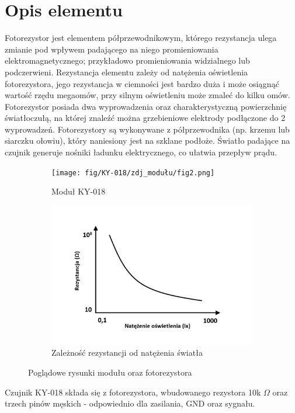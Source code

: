 \documentclass[11pt, a4paper]{article}
\author{Dawid Wasung}
\institute{Instytut Robotyki i Inteligencji Maszynowej}
\begin{document}
\newpage

\section*{Opis elementu} 
Fotorezystor jest elementem półprzewodnikowym, którego rezystancja ulega zmianie pod wpływem padającego na niego promieniowania elektromagnetycznego; przykładowo promieniowania widzialnego lub podczerwieni. Rezystancja elementu zależy od natężenia oświetlenia fotorezystora, jego rezystancja w ciemności jest bardzo duża i może osiągnąć wartość rzędu megaomów, przy silnym oświetleniu może zmaleć do kilku omów. Fotorezystor posiada dwa wyprowadzenia oraz charakterystyczną powierzchnię światłoczułą, na której znaleźć można grzebieniowe elektrody podłączone do 2 wyprowadzeń. Fotorezystory są wykonywane z półprzewodnika (np. krzemu lub siarczku ołowiu), który naniesiony jest na szklane podłoże. Światło padające na czujnik generuje nośniki ładunku elektrycznego, co ułatwia przepływ prądu. 
\vspace{0.5cm}
\begin{figure}[h!]
\centering
\begin{subfigure}{.5\textwidth}
  \centering
  \texttt{[image: fig/KY-018/zdj\_modułu/fig2.png]}
  \caption{Moduł KY-018 \cite{ArduinoModules:grab}}
  \label{fig:sub1}
\end{subfigure}%
\begin{subfigure}{.5\textwidth}
  \centering
  \includegraphics[width=1.05\linewidth]{fig/KY-018/zasada_dzialania/Charakterystyka.png}
  \caption{Zależność rezystancji od natężenia światła \cite{Foto:Wiki}}
  \label{fig:sub2}
\end{subfigure}
\caption{Poglądowe rysunki modułu oraz fotorezystora}
\label{fig:test}
\end{figure}
\newline
Czujnik KY-018 składa się z fotorezystora, wbudowanego rezystora 10k $\Omega$ oraz trzech pinów męskich - odpowiednio dla zasilania, GND oraz sygnału. 
\end{document}
